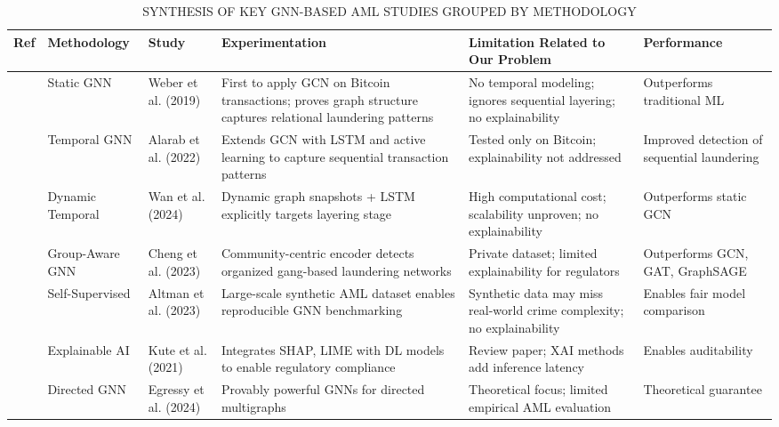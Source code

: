 \documentclass[conference]{IEEEtran}
\begin{document}
\begin{table}[!t]
\caption{SYNTHESIS OF KEY GNN-BASED AML STUDIES GROUPED BY METHODOLOGY}
\label{tab:litreview}
\centering
\renewcommand{\arraystretch}{1.2}
\begin{tabular}{|p{0.4cm}|p{2.8cm}|p{2.6cm}|p{2.8cm}|p{3.0cm}|p{3.0cm}|}
\hline
\textbf{Ref} & \textbf{Methodology } & \textbf{Study} & \textbf{Experimentation} & \textbf{Limitation Related to Our Problem} & \textbf{Performance} \\
\hline
\cite{Weber et al} &
Static GNN & Weber et al. (2019) & First to apply GCN on Bitcoin transactions; proves graph structure captures relational laundering patterns & No temporal modeling; ignores sequential layering; no explainability & Outperforms traditional ML \\
\hline
\cite{Alarab et al} &
Temporal GNN & Alarab et al. (2022) & Extends GCN with LSTM and active learning to capture sequential transaction patterns & Tested only on Bitcoin; explainability not addressed & Improved detection of sequential laundering \\
\hline
\cite{Wan et al} &
Dynamic Temporal & Wan et al. (2024) & Dynamic graph snapshots + LSTM explicitly targets layering stage & High computational cost; scalability unproven; no explainability & Outperforms static GCN \\
\hline
\cite{Cheng et al} &
Group-Aware GNN & Cheng et al. (2023) & Community-centric encoder detects organized gang-based laundering networks & Private dataset; limited explainability for regulators & Outperforms GCN, GAT, GraphSAGE \\
\hline
\cite{Altman et al} &
Self-Supervised & Altman et al. (2023) & Large-scale synthetic AML dataset enables reproducible GNN benchmarking & Synthetic data may miss real-world crime complexity; no explainability & Enables fair model comparison \\
\hline
\cite{Kute et al} &
Explainable AI & Kute et al. (2021) & Integrates SHAP, LIME with DL models to enable regulatory compliance & Review paper; XAI methods add inference latency & Enables auditability \\
\hline
\cite{Egressy et al} &
Directed GNN & Egressy et al. (2024) & Provably powerful GNNs for directed multigraphs & Theoretical focus; limited empirical AML evaluation & Theoretical guarantee \\
\hline
\end{tabular}
\end{table}
\end{document}
